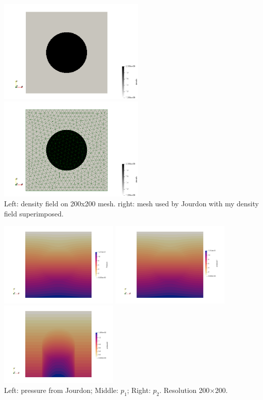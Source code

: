 \begin{center}
\includegraphics[width=7cm]{python_codes/fieldstone_119/results/exp4/rho}
\includegraphics[width=7cm]{python_codes/fieldstone_119/results/exp4/rho_joma22_mesh}\\
{\captionfont Left: density field on 200x200 mesh. right: mesh used by Jourdon with 
my density field superimposed.}
\end{center}

\begin{center}
\includegraphics[width=5.7cm]{python_codes/fieldstone_119/results/exp4/p_joma22}
\includegraphics[width=5.7cm]{python_codes/fieldstone_119/results/exp4/p1}
\includegraphics[width=5.7cm]{python_codes/fieldstone_119/results/exp4/p2}\\
{\captionfont Left: pressure from Jourdon; Middle: $p_1$; Right: $p_2$. Resolution 200$\times$200.}
\end{center}

